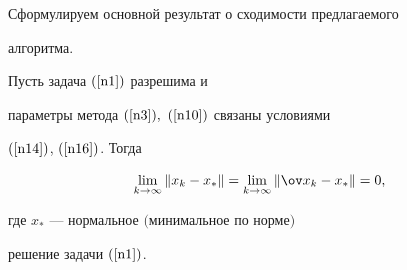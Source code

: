 Сформулируем основной результат о сходимости предлагаемого


алгоритма.





\begin{thm}


Пусть задача $(\ref{n1})$ разрешима и


параметры метода $(\ref{n3}),\ (\ref{n10})$ связаны условиями


$(\ref{n14})$, $(\ref{n16})$. Тогда


\begin{equation}\label{n99}


\lim_{k\to\infty}\|x_k-x_*\|=


\lim_{k\to\infty}\|\ov x_k-x_*\|=0,


\end{equation}


где $x_*$ --- нормальное $($минимальное по норме$)$


решение задачи $(\ref{n1})$.


\end{thm}





